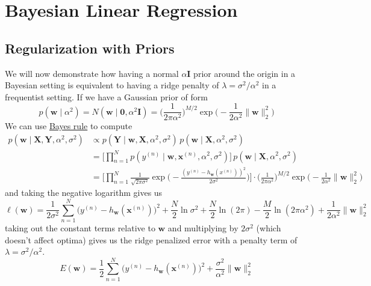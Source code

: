 \section{Bayesian Linear Regression} 

  \subsection{Regularization with Priors}

    We will now demonstrate how having a normal $\alpha \mathbf{I}$ prior around the origin in a Bayesian setting is equivalent to having a ridge penalty of $\lambda = \sigma^2 / \alpha^2$ in a frequentist setting. If we have a Gaussian prior of form 
    \begin{equation}
      p(\mathbf{w} \mid \alpha^2) = N(\mathbf{w} \mid \mathbf{0}, \alpha^2 \mathbf{I}) = \bigg( \frac{1}{2 \pi \alpha^2} \bigg)^{M/2} \exp \bigg( -\frac{1}{2\alpha^2} \|\mathbf{w}\|^2_2 \bigg)
    \end{equation}
    We can use \hyperref[prob-thm:bayes-rule]{Bayes rule} to compute 
    \begin{align*}
        p(\mathbf{w} \mid \mathbf{X}, \mathbf{Y}, \alpha^2, \sigma^2) & \propto p(\mathbf{Y} \mid \mathbf{w}, \mathbf{X}, \alpha^2, \sigma^2) \, p(\mathbf{w} \mid \mathbf{X}, \alpha^2, \sigma^2) \\
        & = \bigg[ \prod_{n=1}^N p(y^{(n)} \mid \mathbf{w}, \mathbf{x}^{(n)}, \alpha^2, \sigma^2 )\bigg] \, p(\mathbf{w} \mid \mathbf{X}, \alpha^2, \sigma^2) \\
        & = \bigg[ \prod_{n=1}^N \frac{1}{\sqrt{2 \pi \sigma^2}} \exp \bigg( - \frac{(y^{(n)} - h_\mathbf{w} (x^{(n)}))^2}{2 \sigma^2} \bigg) \bigg] \cdot \bigg( \frac{1}{2 \pi \alpha^2} \bigg)^{M/2} \exp \bigg( -\frac{1}{2\alpha^2} \|\mathbf{w}\|^2_2 \bigg)
    \end{align*}
    and taking the negative logarithm gives us 
    \begin{equation}
      \ell(\mathbf{w}) = \frac{1}{2\sigma^2} \sum_{n=1}^N \big(y^{(n)} - h_\mathbf{w} (\mathbf{x}^{(n)}) \big)^2 + \frac{N}{2}\ln{\sigma^2} + \frac{N}{2} \ln(2\pi) - \frac{M}{2} \ln(2\pi \alpha^2) + \frac{1}{2 \alpha^2} \|\mathbf{w}\|_2^2
    \end{equation}
    taking out the constant terms relative to $\mathbf{w}$ and multiplying by $2 \sigma^2$ (which doesn't affect optima) gives us the ridge penalized error with a penalty term of $\lambda = \sigma^2 / \alpha^2$. 
    \begin{equation}
      E(\mathbf{w}) = \frac{1}{2} \sum_{n=1}^N \big(y^{(n)} - h_\mathbf{w} (\mathbf{x}^{(n)}) \big)^2 + \frac{\sigma^2}{\alpha^2} \|\mathbf{w}\|_2^2
    \end{equation}

